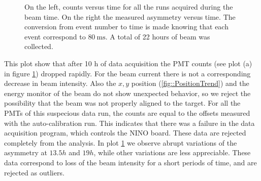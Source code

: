 \begin{figure}[hbtp]
\centering
{}
\caption{On the left, counts versus time for all the runs acquired during the beam time. On the right the measured asymmetry versus time. The conversion from event number to time is made knowing that each event correspond to $\SI{80}{\milli \second}$. A total of 22 hours of beam was collected.}
\label{fig::CountTrend}
\end{figure}

This plot show that after 10 h of data acquisition the PMT counts (see plot (a) in figure \ref{fig::CountTrend}) dropped rapidly. For the beam current there is not a corresponding decrease in beam intensity. Also the $x,y$ position (\ref{fig::PositionTrend}) and the energy monitor of the beam do not show unexpected behavior, so we reject the possibility that the beam was not properly aligned to the target.
For all the PMTs of this suspecious data run, the counts are equal to the offsets measured with the auto-calibration run. 
This indicates that there was a failure in the data acquisition program, which controls the NINO board. These data are rejected completely from the analysis.
In plot \ref{fig::CountTrend} we observe abrupt variations of the asymmetry at $13.5 h$ and $19 h$, while other variations are less appreciable. These data correspond to loss of the beam intensity for a short periods of time, and are rejected as outliers. 

